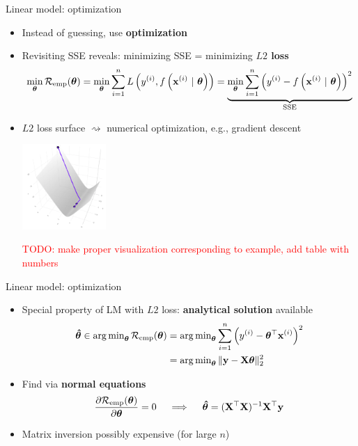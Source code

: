 \documentclass[11pt,compress,t,notes=noshow, xcolor=table]{beamer}
\begin{document}
\begin{vbframe}{Linear model: optimization}

\begin{itemize}
    \item Instead of guessing, use \textbf{optimization}
    \item Revisiting SSE reveals: minimizing SSE = minimizing 
    \textbf{$L2$ loss} 
    \footnotesize
    \begin{align*}
        \min_{\bm{\theta}} \mathcal{R}_{\text{emp}}(\bm{\theta}) = \min_{\bm{\theta}} \sum\limits_{i=1}^n L\left(y^{(i)}, f\left(\mathbf{x}^{(i)} ~|~ \bm{\theta}\right)\right) = 
        \underbrace{\min_{\bm{\theta}} \sum\limits_{i=1}^n \left(y^{(i)} - f\left(\mathbf{x}^{(i)} ~|~ \bm{\theta}\right)\right)^2}_{
        \text{SSE}}
    \end{align*}
    \normalsize
    \item $L2$ loss surface $\rightsquigarrow$ numerical optimization, e.g.,
    gradient descent
    
    \includegraphics[width=0.25\textwidth]{figure/ss_surf.png}
    
    \textcolor{red}{TODO: make proper visualization corresponding to example, 
    add table with numbers}
\end{itemize}

\end{vbframe}


\begin{vbframe}{Linear model: optimization}

\begin{itemize}
    \item Special property of LM with $L2$ loss: \textbf{analytical solution}
    available
    \begin{align*}
        \bm{\hat\theta} \in 
        \operatorname{arg\,min}_{\bm{\theta}} \mathcal{R}_{\text{emp}}(\bm{\theta}) &=
        \operatorname{arg\,min}_{\bm{\theta}} \sum\limits_{i=1}^n \left(y^{(i)} - \bm{\theta}^\top \mathbf{x}^{(i)} \right)^2  \\
        &= \operatorname{arg\,min}_{\bm{\theta}} \| \mathbf{y} - \mathbf{X} \bm{\theta} \|^2_2
    \end{align*}
    \normalsize
    \item Find via \textbf{normal equations}
    $$
    \frac{\partial{\mathcal{R}_{\text{emp}}(\bm{\theta})}}{\partial \bm{\theta}} = 0 \quad\implies\quad \bm{\hat\theta} = (\mathbf{X}^\top \mathbf{X})^{-1} \mathbf{X}^\top \mathbf{y}
    $$
    \item Matrix inversion possibly expensive (for large $n$)
\end{itemize}

\end{vbframe}


\endlecture
\end{document}
